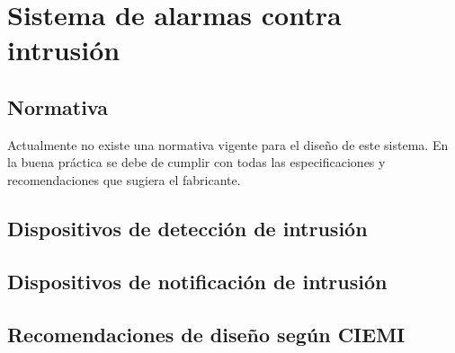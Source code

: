 %
%
%
%
%	
%	
%	
%	
%	







\newpage

\section{Sistema de alarmas contra intrusión}

\subsection{Normativa}

Actualmente no existe una normativa vigente para el diseño de este sistema. En la buena práctica se debe de cumplir con todas las especificaciones y recomendaciones que sugiera el fabricante.


\subsection{Dispositivos de detección de intrusión}

\subsection{Dispositivos de notificación de intrusión}

\subsection{Recomendaciones de diseño según CIEMI}


